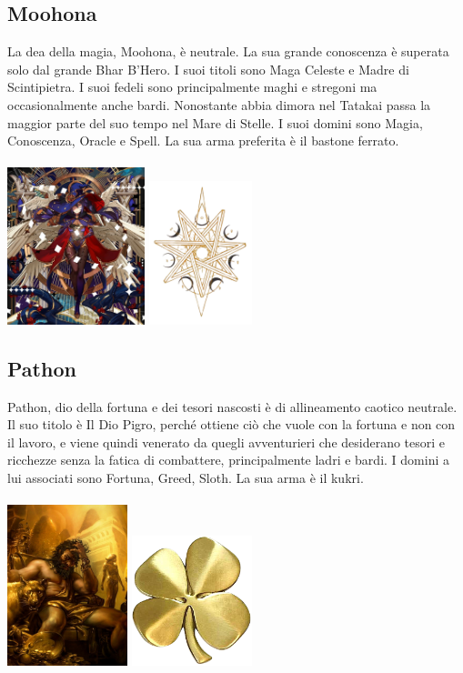 \documentclass[10pt, a4paper]{report}
\begin{document}
\begin{multicols}{2}
\subsection*{Moohona}
La dea della magia, Moohona, è neutrale. La sua grande conoscenza è superata solo dal grande Bhar B'Hero. I suoi titoli sono Maga Celeste e Madre di Scintipietra. I suoi fedeli sono principalmente maghi e stregoni ma occasionalmente anche bardi. Nonostante abbia dimora nel Tatakai passa la maggior parte del suo tempo nel Mare di Stelle. I suoi domini sono Magia, Conoscenza, Oracle e Spell. La sua arma preferita è il bastone ferrato.\\
\\
\includegraphics[width=4cm]{mona1.jpeg}
\includegraphics[width=3cm]{moohona_simbolo.jpg}
\subsection*{Pathon}
Pathon, dio della fortuna e dei tesori nascosti è di allineamento caotico neutrale. Il suo titolo è Il Dio Pigro, perché ottiene ciò che vuole con la fortuna e non con il lavoro, e viene quindi venerato da quegli avventurieri che desiderano tesori e ricchezze senza la fatica di combattere, principalmente ladri e bardi. I domini a lui associati sono Fortuna, Greed, Sloth. La sua arma è il kukri.\\
\\
\includegraphics[width=3.5cm]{pathon.jpg}
\includegraphics[width=3.5cm]{pathon_simbolo.png}

\end{multicols}
\end{document}
